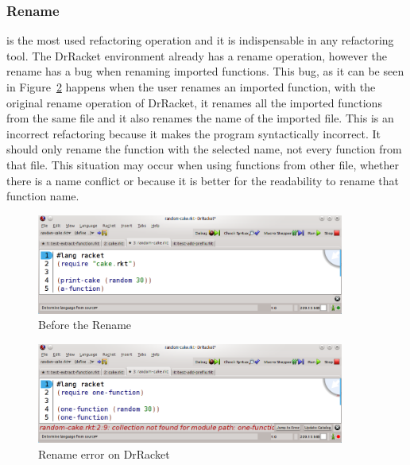 \subsubsection{Rename}
\label{ssub:Rename}
is the most used refactoring operation and it is indispensable in any refactoring tool.
The DrRacket environment already has a rename operation, however the rename has a bug when renaming imported functions.
This bug, as it can be seen in Figure~\ref{fig:RacketBug} happens when the user renames an imported function, with the original rename operation of DrRacket, it renames all the imported functions from the same file and it also renames the name of the imported file.
This is an incorrect refactoring because it makes the program syntactically incorrect. It should only rename the function with the selected name, not every function from that file.
This situation may occur when using functions from other file, whether there is a name conflict or because it is better for the readability to rename that function name.
\begin{figure}[htbp]
	\centering
	\includegraphics[width=0.9\textwidth]{img/renameV2-1.png}
	\caption{Before the Rename}
	\label{fig:renameBefore}
\end{figure}

\begin{figure}[htbp]
	\centering
	\includegraphics[width=0.9\textwidth]{img/rename-error.png}
	\caption{Rename error on DrRacket}
	\label{fig:RacketBug}
\end{figure}

